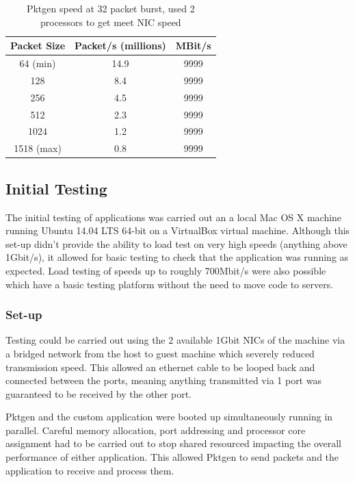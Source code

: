 \documentclass[final_report.tex]{subfiles}
\begin{document}
\begin{table}[H]
	\centering
	\begin{tabular} { | c | c | c | }
		\hline
		\textbf{Packet Size} & \textbf{Packet/s (millions)} & \textbf{MBit/s} \\
		\hline
		64 (min) & 14.9 & 9999 \\
		\hline
		128 & 8.4 & 9999 \\
		\hline
		256 & 4.5 & 9999 \\
		\hline
		512 & 2.3 & 9999 \\
		\hline
		1024 & 1.2 & 9999 \\
		\hline
		1518 (max) & 0.8 & 9999 \\
		\hline
	\end{tabular}
	\caption{Pktgen speed at 32 packet burst, used 2 processors to get meet NIC speed}
	\label{tab:pktgen}
\end{table}

\subsection{Initial Testing}
The initial testing of applications  was carried out an a local Mac OS X machine running Ubuntu 14.04 LTS 64-bit on a VirtualBox  virtual machine. Although this set-up didn't provide the ability to load test on very high speeds (anything above 1Gbit/s), it allowed for basic testing to check that the application was running as expected. Load testing of speeds up to roughly 700Mbit/s were also possible which have a basic testing platform without the need to move code to servers.

\subsubsection{Set-up}
Testing could be carried out using the 2 available 1Gbit NICs of the machine via a bridged network from the host to guest machine which severely reduced transmission speed. This allowed an ethernet cable to be looped back and connected between the ports, meaning anything transmitted via 1 port was guaranteed to be received by the other port.

Pktgen and the custom application were booted up simultaneously running in parallel. Careful memory allocation, port addressing and processor core assignment had to be carried out to stop shared resourced impacting the overall performance of either application. This allowed Pktgen to send packets and the application to receive and process them.
\end{document}
